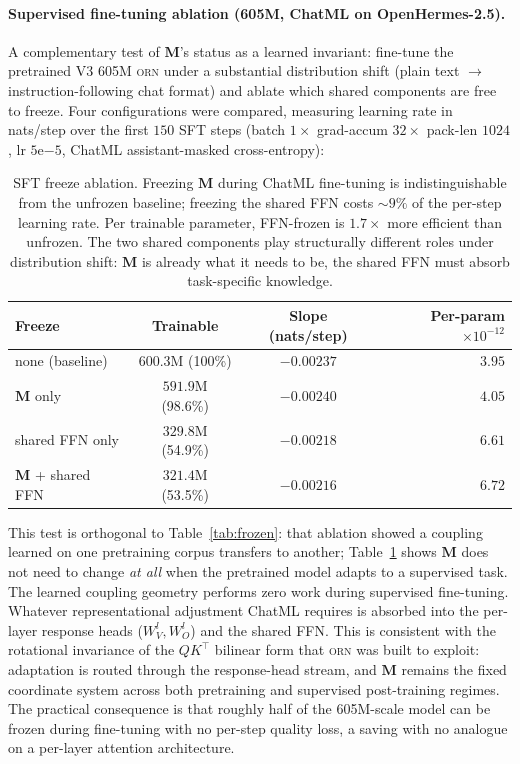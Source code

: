 \documentclass[10pt,twocolumn]{article}
\newcommand{\M}{\mathbf{M}}
\newcommand{\orn}{\textsc{orn}}
\begin{document}
\paragraph{Supervised fine-tuning ablation (605M, ChatML on OpenHermes-2.5).}
A complementary test of $\M$'s status as a learned invariant: fine-tune the pretrained V3 605M \orn{} under a substantial distribution shift (plain text $\to$ instruction-following chat format) and ablate which shared components are free to freeze. Four configurations were compared, measuring learning rate in nats/step over the first $150$ SFT steps (batch $1 \times$ grad-accum $32 \times$ pack-len $1024$, lr $5\mathrm{e}{-5}$, ChatML assistant-masked cross-entropy):

\begin{table}[t]
\centering\small
\begin{tabular}{@{}lccr@{}}
\toprule
\textbf{Freeze} & \textbf{Trainable} & \textbf{Slope (nats/step)} & \textbf{Per-param $\times 10^{-12}$} \\
\midrule
none (baseline)      & $600.3$M (100\%)  & $-0.00237$ & $3.95$ \\
$\M$ only           & $591.9$M (98.6\%) & $-0.00240$ & $4.05$ \\
shared FFN only      & $329.8$M (54.9\%) & $-0.00218$ & $6.61$ \\
$\M$ + shared FFN    & $321.4$M (53.5\%) & $-0.00216$ & $\mathbf{6.72}$ \\
\bottomrule
\end{tabular}
\caption{SFT freeze ablation. Freezing $\M$ during ChatML fine-tuning is indistinguishable from the unfrozen baseline; freezing the shared FFN costs $\sim\!9\%$ of the per-step learning rate. Per trainable parameter, FFN-frozen is $1.7\times$ more efficient than unfrozen. The two shared components play structurally different roles under distribution shift: $\M$ is already what it needs to be, the shared FFN must absorb task-specific knowledge.}
\label{tab:sft_freeze}
\end{table}

This test is orthogonal to Table~\ref{tab:frozen}: that ablation showed a coupling learned on one pretraining corpus transfers to another; Table~\ref{tab:sft_freeze} shows $\M$ does not need to change \emph{at all} when the pretrained model adapts to a supervised task. The learned coupling geometry performs zero work during supervised fine-tuning. Whatever representational adjustment ChatML requires is absorbed into the per-layer response heads ($W_V^l, W_O^l$) and the shared FFN. This is consistent with the rotational invariance of the $QK^\top$ bilinear form that \orn{} was built to exploit: adaptation is routed through the response-head stream, and $\M$ remains the fixed coordinate system across both pretraining and supervised post-training regimes. The practical consequence is that roughly half of the 605M-scale model can be frozen during fine-tuning with no per-step quality loss, a saving with no analogue on a per-layer attention architecture.
\end{document}
